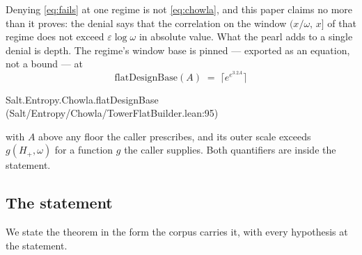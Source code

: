 \documentclass[11pt]{amsart}
\newcommand{\leanname}[1]{\par{\noindent\small\ttfamily\raggedright #1\par}}
\theoremstyle{remark}
\begin{document}
Denying \eqref{eq:fails} at one regime is not \eqref{eq:chowla}, and this
paper claims no more than it proves: the denial says that the correlation on
the window $(x/\omega,\,x]$ of that regime does not exceed
$\varepsilon\log\omega$ in absolute value. What the pearl adds to a single
denial is depth. The regime's window base is pinned --- exported as an
equation, not a bound --- at
\[
\mathrm{flatDesignBase}(A) \;=\; \bigl\lceil e^{e^{3.2A}} \bigr\rceil
\]
\leanname{Salt.Entropy.Chowla.flatDesignBase
(Salt/\allowbreak Entropy/\allowbreak Chowla/\allowbreak TowerFlatBuilder.lean:95)}
\noindent with $A$ above any floor the caller prescribes, and its outer scale exceeds
$g(H_+, \omega)$ for a function $g$ the caller supplies. Both quantifiers are
inside the statement.

\subsection{The statement}
We state the theorem in the form the corpus carries it, with every hypothesis
at the statement.
\end{document}
